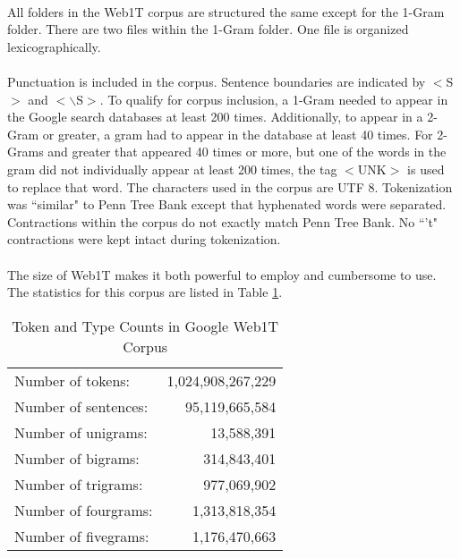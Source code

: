		\paragraph{} All folders in the Web1T corpus are structured the same except for the 1-Gram folder.  There are two files within the 1-Gram folder.  One file is organized lexicographically.\cite{brants_web_2006}
		\paragraph{} Punctuation is included in the corpus.  Sentence boundaries are indicated by $<$S$>$ and $<\backslash\text{S}>$.  To qualify for corpus inclusion, a 1-Gram needed to appear in the Google search databases at least 200 times.  Additionally, to appear in a 2-Gram or greater, a gram had to appear in the database at least 40 times.  For 2-Grams and greater that appeared 40 times or more, but one of the words in the gram did not individually appear at least 200 times, the tag $<$UNK$>$ is used to replace that word.  The characters used in the corpus are UTF 8.  Tokenization was ``similar" to Penn Tree Bank except that hyphenated words were separated.\cite{brants_web_2006}  Contractions within the corpus do not exactly match Penn Tree Bank.  No ``'t" contractions were kept intact during tokenization.
		\paragraph{} The size of Web1T makes it both powerful to employ and cumbersome to use. The statistics for this corpus are listed in Table \ref{table:GoogleWeb1T}.
		\begin{center}	
			\begin{table}[h]

				\begin{center}
					\begin{tabular}{ l r }
						Number of tokens: & 1,024,908,267,229\\
						Number of sentences: & 95,119,665,584\\
						Number of unigrams: & 13,588,391\\
						Number of bigrams: & 314,843,401\\
						Number of trigrams: & 977,069,902\\
						Number of fourgrams: & 1,313,818,354\\
						Number of fivegrams: & 1,176,470,663\\
					\end{tabular}
				\caption{Token and Type Counts in Google Web1T Corpus}
				\label{table:GoogleWeb1T}
				\end{center}
			\end{table}
		\end{center}

